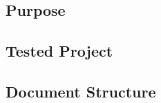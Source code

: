 \subsection{Purpose}
\label{sect:introduction:purpose}


\subsection{Tested Project}
\label{sect:introduction:testedsystem}


\subsection{Document Structure}
\label{sect:introduction:docstructure}
